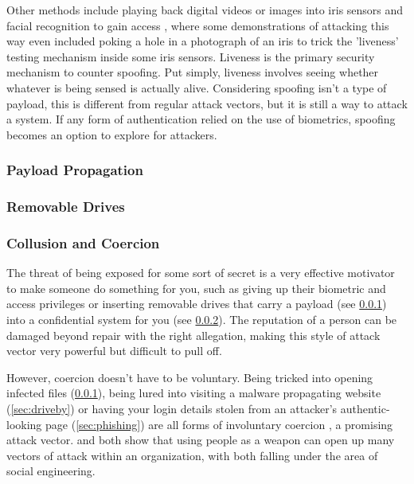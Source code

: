 \documentclass[a4paper, 11pt]{article}
\begin{document}
Other methods include playing back digital videos or images into iris sensors and facial recognition to gain access \cite{ref:bodybiometrie,ref:biometricattackvectors}, where some demonstrations of attacking this way even included poking a hole in a photograph of an iris to trick the 'liveness' testing mechanism inside some iris sensors. Liveness is the primary security mechanism to counter spoofing. Put simply, liveness involves seeing whether whatever is being sensed is actually alive. \cite{ref:biometricattackvectors} Considering spoofing isn't a type of payload, this is different from regular attack vectors, but it is still a way to attack a system. If any form of authentication relied on the use of biometrics, spoofing becomes an option to explore for attackers.

\subsubsection{Payload Propagation}
\label{sec:payloads}

\subsubsection{Removable Drives}
\label{sec:removabledrives}

\subsubsection{Collusion and Coercion}
\label{sec:coercion}
The threat of being exposed for some sort of secret is a very effective motivator to make someone do something for you, such as giving up their biometric and access privileges \cite{ref:biometricattackvectors} or inserting removable drives that carry a payload (see \ref{sec:payloads}) into a confidential system for you (see \ref{sec:removabledrives}). The reputation of a person can be damaged beyond repair with the right allegation, making this style of attack vector very powerful but difficult to pull off.

However, coercion doesn't have to be voluntary. Being tricked into opening infected files (\ref{sec:payloads}), being lured into visiting a malware propagating website (\ref{sec:driveby}) or having your login details stolen from an attacker's authentic-looking page (\ref{sec:phishing}) are all forms of involuntary coercion \cite{ref:jang2014survey,ref:singer2014cybersecurity}, a promising attack vector. \cite{ref:biometricattackvectors} and \cite{ref:jang2014survey} both show that using people as a weapon can open up many vectors of attack within an organization, with both falling under the area of social engineering. \cite{ref:singer2014cybersecurity}
\end{document}
